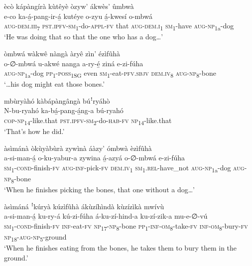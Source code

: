 ècò kápàngírà kùtêyè òzyw’ ákwès’ ûmbwà\\
\gll e-co    ka-á̲-pang-ir-á̲    kutéye o-zyu    á̲-kwesí  o-mbwá \\
\textsc{aug}{}-\textsc{dem}.\textsc{iii}\textsubscript{7}  \textsc{pst}.\textsc{ipfv}{}-\textsc{sm}\textsubscript{1}{}-do-\textsc{appl}{}-\textsc{fv}  that
\textsc{aug}{}-\textsc{dem}.\textsc{i}\textsubscript{1}  \textsc{sm}\textsubscript{1}{}-have  \textsc{aug}{}-\textsc{np}\textsubscript{1a}{}-dog\\
\glt ‘He was doing that so that the one who has a dog…’\bigskip

òmbwá wàkwê nàngà àryê zìn’ ézìfûhà\\
\gll o-∅-mbwá    u-akwé  nanga  a-ry-é̲   ziná    e-zi-fúha \\
\textsc{aug}{}-\textsc{np}\textsubscript{1a}{}-dog  \textsc{pp}\textsubscript{1}{}-\textsc{poss}\textsubscript{1SG}  even  \textsc{sm}\textsubscript{1}{}-eat-\textsc{pfv}.\textsc{sbjv}
\textsc{dem}.\textsc{iv}\textsubscript{8}  \textsc{aug}{}-\textsc{np}\textsubscript{8}{}-bone\\
\glt ‘…his dog might eat those bones.’\bigskip

mbùryàhó kàbápàngângà búꜝryáhò\\
\gll N-bu-ryahó    ka-bá̲-pang-á̲ng-a    bú-ryahó\\
\textsc{cop}{}-\textsc{np}\textsubscript{14}{}-like.that  \textsc{pst}.\textsc{ipfv}{}-\textsc{sm}\textsubscript{2}{}-do-\textsc{hab}{}-\textsc{fv}  \textsc{np}\textsubscript{14}{}-like.that\\
\glt ‘That’s how he did.’\bigskip

àsìmánà òkùyàbùrà zywìnà áàzy’ ómbwà èzìfûhà\\
\gll a-si-man-á̲    o-ku-yabur-a zywina  á̲-azyá      o-∅-mbwá    e-zi-fúha \\
\textsc{sm}\textsubscript{1}{}-\textsc{cond}{}-finish-\textsc{fv}  \textsc{aug}{}-\textsc{inf}{}-pick-\textsc{fv}
\textsc{dem}.\textsc{iv}\textsubscript{1}  \textsc{sm}\textsubscript{1}.\textsc{rel}{}-have\_not  \textsc{aug}{}-\textsc{np}\textsubscript{1a}{}-dog  \textsc{aug}{}-\textsc{np}\textsubscript{8}{}-bone\\
\glt ‘When he finishes picking the bones, that one without a dog…’\bigskip

àsìmáná ꜝkúryà kúzìfûhà ákùzíhìndà kùzízìkà mwívù\\
\gll a-si-man-á̲      ku-ry-á  kú-zi-fúha á-ku-zí-hind-a    ku-zí-zik-a    mu-e-∅-vú\\
\textsc{sm}\textsubscript{1}{}-\textsc{cond}{}-finish-\textsc{fv}  \textsc{inf}{}-eat-\textsc{fv}  \textsc{np}\textsubscript{17}{}-\textsc{np}\textsubscript{8}{}-bone
\textsc{pp}\textsubscript{1}{}-\textsc{inf}{}-\textsc{om}\textsubscript{8}{}-take-\textsc{fv}  \textsc{inf}{}-\textsc{om}\textsubscript{8}{}-bury-\textsc{fv}  \textsc{np}\textsubscript{18}{}-\textsc{aug}{}-\textsc{np}\textsubscript{5}{}-ground\\
\glt ‘When he finishes eating from the bones, he takes them to bury them in the ground.’\bigskip

